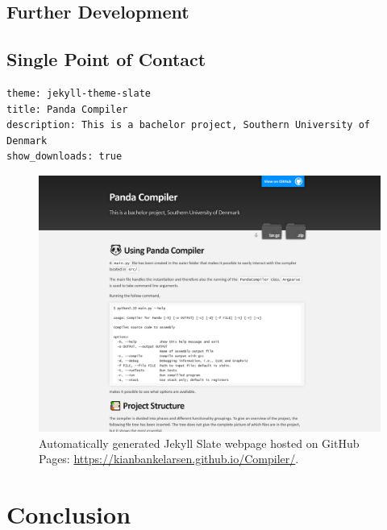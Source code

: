 \section{Further Development}

\newpage

\section{Single Point of Contact}

\begin{verbatim}
theme: jekyll-theme-slate
title: Panda Compiler
description: This is a bachelor project, Southern University of Denmark
show_downloads: true
\end{verbatim}

\begin{figure}[H]
    \centering
    \includegraphics[width=1\textwidth]{misc/images/GitHub_Pages.png}
    \caption{Automatically generated Jekyll Slate webpage hosted on GitHub Pages: \url{https://kianbankelarsen.github.io/Compiler/}.}
    \label{fig:GitHub_Pages}
\end{figure}


\chapter{Conclusion}

\cleardoublepage
{}
{}
\printbibliography

